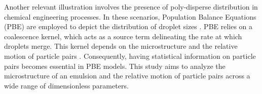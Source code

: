 


Another relevant illustration involves the presence of poly-disperse distribution in chemical engineering processes. In these scenarios, Population Balance Equations (PBE) are employed to depict the distribution of droplet sizes \citep{randolph2012theory}. PBE relies on a coalescence kernel, which acts as a source term delineating the rate at which droplets merge. This kernel depends on the microstructure and the relative motion of particle pairs \citep{chesters1991modelling}. Consequently, having statistical information on particle pairs becomes essential in PBE models. This study aims to analyze the microstructure of an emulsion and the relative motion of particle pairs across a wide range of dimensionless parameters.


